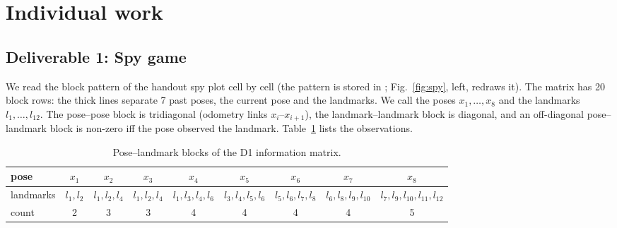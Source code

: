 \section{Individual work}

\subsection{Deliverable 1: Spy game}\label{sec:d1}

We read the block pattern of the handout spy plot cell by cell (the pattern is stored in
; Fig.~\ref{fig:spy}, left, redraws it). The matrix has
20 block rows: the thick lines separate 7 past poses, the current pose and the landmarks.
We call the poses $x_1,\dots,x_8$ and the landmarks $l_1,\dots,l_{12}$. The pose--pose
block is tridiagonal (odometry links $x_i$--$x_{i+1}$), the landmark--landmark block is
diagonal, and an off-diagonal pose--landmark block is non-zero iff the pose observed the
landmark. Table~\ref{tab:spy} lists the observations.

\begin{table}[H]
\centering\footnotesize\setlength{\tabcolsep}{3.5pt}
\begin{tabular}{lcccccccc}
\toprule
pose & $x_1$ & $x_2$ & $x_3$ & $x_4$ & $x_5$ & $x_6$ & $x_7$ & $x_8$ \\
\midrule
landmarks & $l_1,l_2$ & $l_1,l_2,l_4$ & $l_1,l_2,l_4$ & $l_1,l_3,l_4,l_6$ &
$l_3,l_4,l_5,l_6$ & $l_5,l_6,l_7,l_8$ & $l_6,l_8,l_9,l_{10}$ & $l_7,l_9,l_{10},l_{11},l_{12}$ \\
count & 2 & 3 & 3 & 4 & 4 & 4 & 4 & 5 \\
\bottomrule
\end{tabular}
\caption{Pose--landmark blocks of the D1 information matrix.}\label{tab:spy}
\end{table}

